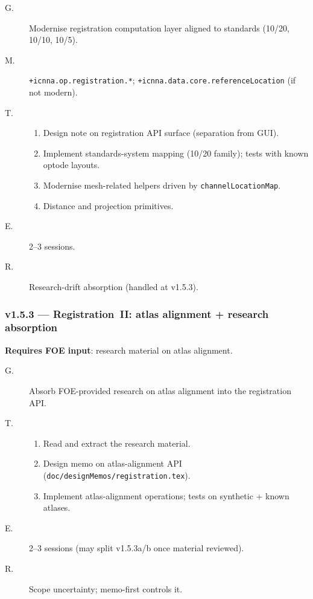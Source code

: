 \documentclass[11pt,a4paper]{article}
\begin{document}
\begin{description}
    \item[G.] Modernise registration computation layer aligned to standards (10/20, 10/10, 10/5).
    \item[M.] \texttt{+icnna.op.registration.*}; \texttt{+icnna.data.core.referenceLocation} (if not modern).
    \item[T.]
        \begin{enumerate}[nosep]
            \item Design note on registration API surface (separation from GUI).
            \item Implement standards-system mapping (10/20 family); tests with known optode layouts.
            \item Modernise mesh-related helpers driven by \texttt{channelLocationMap}.
            \item Distance and projection primitives.
        \end{enumerate}
    \item[E.] 2--3 sessions.
    \item[R.] Research-drift absorption (handled at v1.5.3).
\end{description}

\subsubsection*{v1.5.3 --- Registration~II: atlas alignment + research absorption}

\textbf{Requires FOE input}: research material on atlas alignment.

\begin{description}
    \item[G.] Absorb FOE-provided research on atlas alignment into the registration API.
    \item[T.]
        \begin{enumerate}[nosep]
            \item Read and extract the research material.
            \item Design memo on atlas-alignment API (\texttt{doc/designMemos/registration.tex}).
            \item Implement atlas-alignment operations; tests on synthetic + known atlases.
        \end{enumerate}
    \item[E.] 2--3 sessions (may split v1.5.3a/b once material reviewed).
    \item[R.] Scope uncertainty; memo-first controls it.
\end{description}
\end{document}
